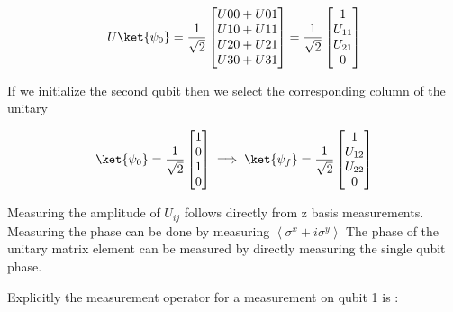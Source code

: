 \begin{equation}
    U\ket{\psi_0} =
    \frac{1}{\sqrt{2}}
    \begin{bmatrix}
        U00 + U01 \\
        U10 + U11 \\
        U20 + U21 \\
        U30 + U31 \\
    \end{bmatrix}
    =
    \frac{1}{\sqrt{2}}
    \begin{bmatrix}
        1 \\
        U_{11} \\
        U_{21} \\
        0 \\
    \end{bmatrix}
\end{equation}

If we initialize the second qubit then we select the corresponding column of the unitary

\begin{equation}
    \ket{\psi_0}=\frac{1}{\sqrt{2}}
    \begin{bmatrix}
        1 \\
        0 \\
        1 \\
        0 \\
    \end{bmatrix}
    \implies
    \ket{\psi_{f}}=
    \frac{1}{\sqrt{2}}
    \begin{bmatrix}
        1 \\
        U_{12} \\
        U_{22} \\
        0 \\
    \end{bmatrix}
\end{equation}

Measuring the amplitude of $U_{ij}$ follows directly from z basis measurements.
Measuring the phase can be done by measuring $\left< \sigma^{x} + i\sigma^{y} \right>$
The phase of the unitary matrix element can be measured by directly measuring the single qubit phase.

Explicitly the measurement operator for a measurement on qubit 1 is :

